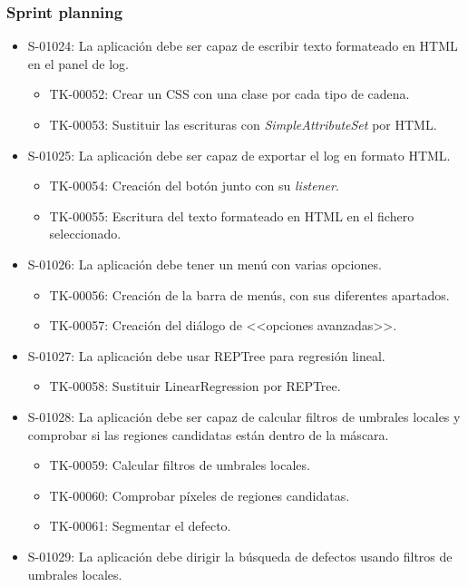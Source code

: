 \subsubsection*{Sprint planning}
\begin{itemize}
 \item S-01024: La aplicación debe ser capaz de escribir texto formateado en HTML en el panel de log.
  \begin{itemize}
   \item TK-00052: Crear un CSS con una clase por cada tipo de cadena.
   \item TK-00053: Sustituir las escrituras con \emph{SimpleAttributeSet} por HTML.
  \end{itemize}
 \item S-01025: La aplicación debe ser capaz de exportar el log en formato HTML.
  \begin{itemize}
   \item TK-00054: Creación del botón junto con su \emph{listener}.
   \item TK-00055: Escritura del texto formateado en HTML en el fichero seleccionado.
  \end{itemize}
 \item S-01026: La aplicación debe tener un menú con varias opciones.
  \begin{itemize}
   \item TK-00056: Creación de la barra de menús, con sus diferentes apartados.
   \item TK-00057: Creación del diálogo de <<opciones avanzadas>>.
  \end{itemize}
 \item S-01027: La aplicación debe usar REPTree para regresión lineal.
  \begin{itemize}
   \item TK-00058: Sustituir LinearRegression por REPTree.
  \end{itemize}
 \item S-01028: La aplicación debe ser capaz de calcular filtros de umbrales locales y comprobar si las regiones candidatas están dentro de la máscara.
  \begin{itemize}
   \item TK-00059: Calcular filtros de umbrales locales.
   \item TK-00060: Comprobar píxeles de regiones candidatas.
   \item TK-00061: Segmentar el defecto.
  \end{itemize}
 \item S-01029: La aplicación debe dirigir la búsqueda de defectos usando filtros de umbrales locales.

\end{itemize}
